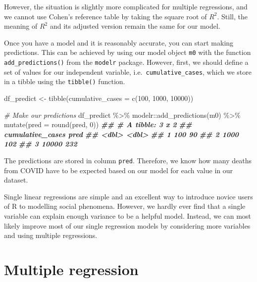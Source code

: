 \documentclass[
]{book}
\newenvironment{Shaded}{\begin{snugshade}}{\end{snugshade}}
\newcommand{\AttributeTok}[1]{\textcolor[rgb]{0.77,0.63,0.00}{#1}}
\newcommand{\CommentTok}[1]{\textcolor[rgb]{0.56,0.35,0.01}{\textit{#1}}}
\newcommand{\DecValTok}[1]{\textcolor[rgb]{0.00,0.00,0.81}{#1}}
\newcommand{\DocumentationTok}[1]{\textcolor[rgb]{0.56,0.35,0.01}{\textbf{\textit{#1}}}}
\newcommand{\FunctionTok}[1]{\textcolor[rgb]{0.00,0.00,0.00}{#1}}
\newcommand{\NormalTok}[1]{#1}
\newcommand{\OtherTok}[1]{\textcolor[rgb]{0.56,0.35,0.01}{#1}}
\newcommand{\SpecialCharTok}[1]{\textcolor[rgb]{0.00,0.00,0.00}{#1}}
\begin{document}
However, the situation is slightly more complicated for multiple regressions, and we cannot use Cohen's reference table by taking the square root of \(R^2\). Still, the meaning of \(R^2\) and its adjusted version remain the same for our model.

Once you have a model and it is reasonably accurate, you can start making predictions. This can be achieved by using our model object \texttt{m0} with the function \texttt{add\_predictions()} from the \texttt{modelr} package. However, first, we should define a set of values for our independent variable, i.e.~\texttt{cumulative\_cases}, which we store in a tibble using the \texttt{tibble()} function.

\begin{Shaded}
\begin{Highlighting}[]
\NormalTok{df\_predict }\OtherTok{\textless{}{-}}
  \FunctionTok{tibble}\NormalTok{(}\AttributeTok{cumulative\_cases =} \FunctionTok{c}\NormalTok{(}\DecValTok{100}\NormalTok{, }\DecValTok{1000}\NormalTok{, }\DecValTok{10000}\NormalTok{))}

\CommentTok{\# Make our predictions}
\NormalTok{df\_predict }\SpecialCharTok{\%\textgreater{}\%}\NormalTok{ modelr}\SpecialCharTok{::}\FunctionTok{add\_predictions}\NormalTok{(m0) }\SpecialCharTok{\%\textgreater{}\%}
  \FunctionTok{mutate}\NormalTok{(}\AttributeTok{pred =} \FunctionTok{round}\NormalTok{(pred, }\DecValTok{0}\NormalTok{))}
\DocumentationTok{\#\# \# A tibble: 3 x 2}
\DocumentationTok{\#\#   cumulative\_cases  pred}
\DocumentationTok{\#\#              \textless{}dbl\textgreater{} \textless{}dbl\textgreater{}}
\DocumentationTok{\#\# 1              100    90}
\DocumentationTok{\#\# 2             1000   102}
\DocumentationTok{\#\# 3            10000   232}
\end{Highlighting}
\end{Shaded}

The predictions are stored in column \texttt{pred}. Therefore, we know how many deaths from COVID have to be expected based on our model for each value in our dataset.

Single linear regressions are simple and an excellent way to introduce novice users of R to modelling social phenomena. However, we hardly ever find that a single variable can explain enough variance to be a helpful model. Instead, we can most likely improve most of our single regression models by considering more variables and using multiple regressions.

\hypertarget{multiple-regression}{%
\section{Multiple regression}\label{multiple-regression}}
\end{document}
